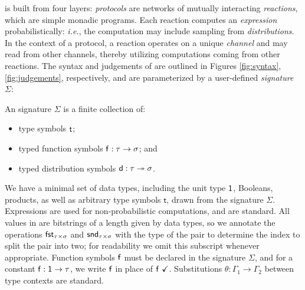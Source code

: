 \newcommand{\Sim}{\mathsf{Sim}}

\ipdl is built from four layers: \emph{protocols} are networks of
mutually interacting \emph{reactions}, which are simple monadic programs. Each reaction computes an \emph{expression} probabilistically: \emph{i.e.}, the computation may include sampling from \emph{distributions}. In the context of a protocol, a reaction operates on a unique \emph{channel} and may read from other channels, thereby utilizing computations coming from other reactions. The syntax and judgements of \ipdl are outlined in Figures \ref{fig:syntax}, \ref{fig:judgements}, respectively, and are parameterized by a user-defined \emph{signature} $\Sigma$:

\begin{definition}[Signature]
An \ipdl signature $\Sigma$ is a finite collection of:
\begin{itemize}
\item type symbols $\mathsf{t}$;
\item typed function symbols $\mathsf{f} : \tau \rightarrow \sigma$; and
\item typed distribution symbols $\mathsf{d} : \tau \twoheadrightarrow \sigma$.
\end{itemize}
\end{definition}

We have a minimal set of data types, including the unit type $\mathsf{1}$, Booleans, products, as well as arbitrary type symbols $\mathsf{t}$, drawn from the signature $\Sigma$. Expressions are used for non-probabilistic computations, and are standard. All values in \ipdl are bitstrings of a length given by data types, so we annotate the operations $\mathsf{fst}_{\tau \times \sigma}$ and $\mathsf{snd}_{\tau \times \sigma}$ with the type of the pair to determine the index to split the pair into two; for readability we omit this subscript whenever appropriate. Function symbols $\mathsf{f}$ must be declared in the signature $\Sigma$, and for a constant $\mathsf{f} : \mathsf{1} \rightarrow \tau$, we write $\mathsf{f}$ in place of $\mathsf{f} \ \checkmark$. Substitutions $\theta : \Gamma_1 \to \Gamma_2$ between type contexts are standard.

